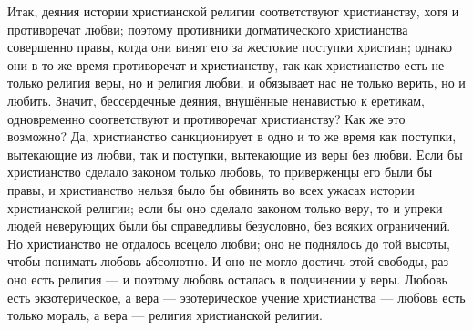 \documentclass[12pt,oneside]{book}
\begin{document}
Итак, деяния истории христианской религии соответствуют христианству, хотя и противоречат любви; поэтому противники догматического христианства совершенно правы, когда они винят его за жестокие поступки христиан; однако они в то же время противоречат и христианству, так как христианство есть не только религия веры, но и религия любви, и обязывает нас не только верить, но и любить. Значит, бессердечные деяния, внушённые ненавистью к еретикам, одновременно соответствуют и противоречат христианству? Как же это возможно? Да, христианство санкционирует в одно и то же время как поступки, вытекающие из любви, так и поступки, вытекающие из веры без любви. Если бы христианство сделало законом только любовь, то приверженцы его были бы правы, и христианство нельзя было бы обвинять во всех ужасах истории христианской религии; если бы оно сделало законом только веру, то и упреки людей неверующих были бы справедливы безусловно, без всяких ограничений. Но христианство не отдалось всецело любви; оно не поднялось до той высоты, чтобы понимать любовь абсолютно. И оно не могло достичь этой свободы, раз оно есть религия --- и поэтому любовь осталась в подчинении у веры. Любовь есть экзотерическое, а вера --- эзотерическое учение христианства --- любовь есть только мораль, а вера --- религия христианской религии.
\end{document}
